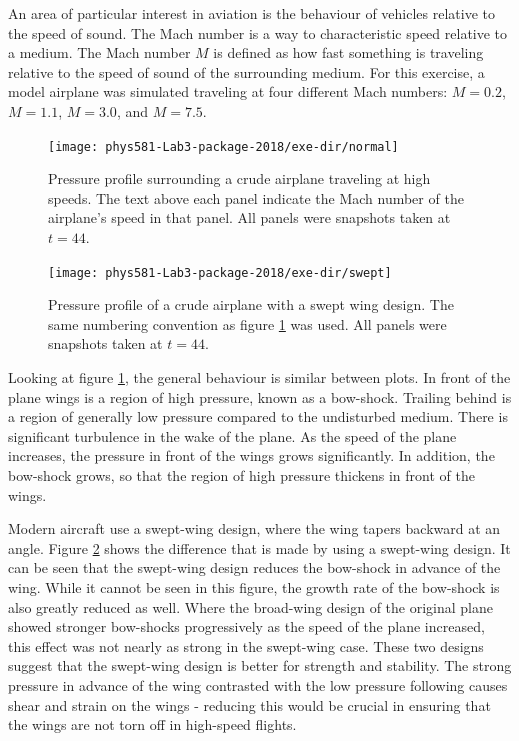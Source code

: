 \documentclass[twocolumn]{article}
\begin{document}
An area of particular interest in aviation is the behaviour of vehicles relative to the speed of sound. The Mach number is a way to characteristic speed relative to a medium. The Mach number $M$ is defined as how fast something is traveling relative to the speed of sound of the surrounding medium. For this exercise, a model airplane was simulated traveling at four different Mach numbers: $M=0.2$, $M=1.1$, $M=3.0$, and $M=7.5$.

\begin{figure}
\centering
\texttt{[image: phys581-Lab3-package-2018/exe-dir/normal]}
\caption{Pressure profile surrounding a crude airplane traveling at high speeds. The text above each panel indicate the Mach number of the airplane's speed in that panel. All panels were snapshots taken at $t=44$.}
\label{fig:normal}
\end{figure}

\begin{figure}
\centering
\texttt{[image: phys581-Lab3-package-2018/exe-dir/swept]}
\caption{Pressure profile of a crude airplane with a swept wing design. The same numbering convention as figure \ref{fig:normal} was used. All panels were snapshots taken at $t=44$.}
\label{fig:swept}
\end{figure}

Looking at figure \ref{fig:normal}, the general behaviour is similar between plots. In front of the plane wings is a region of high pressure, known as a bow-shock. Trailing behind is a region of generally low pressure compared to the undisturbed medium. There is significant turbulence in the wake of the plane. As the speed of the plane increases, the pressure in front of the wings grows significantly. In addition, the bow-shock grows, so that the region of high pressure thickens in front of the wings. 

Modern aircraft use a swept-wing design, where the wing tapers backward at an angle. Figure \ref{fig:swept} shows the difference that is made by using a swept-wing design. It can be seen that the swept-wing design reduces the bow-shock in advance of the wing. While it cannot be seen in this figure, the growth rate of the bow-shock is also greatly reduced as well. Where the broad-wing design of the original plane showed stronger bow-shocks progressively as the speed of the plane increased, this effect was not nearly as strong in the swept-wing case. These two designs suggest that the swept-wing design is better for strength and stability. The strong pressure in advance of the wing contrasted with the low pressure following causes shear and strain on the wings - reducing this would be crucial in ensuring that the wings are not torn off in high-speed flights.
\end{document}
